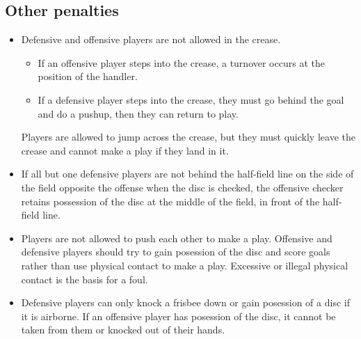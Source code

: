 \documentclass[10pt]{article}
\begin{document}
\subsection{Other penalties}
\begin{itemize}
    \item Defensive and offensive players are not allowed in the crease.
        \begin{itemize}
            \item If an offensive player steps into the crease, a turnover occurs at the position of the handler.
            \item If a defensive player steps into the crease, they must go behind the goal and do a pushup, then they can return to play.
        \end{itemize}
        Players are allowed to jump across the crease, but they must quickly leave the crease and cannot make a play if they land in it.
    \item If all but one defensive players are not behind the half-field line on the side of the field opposite the offense when the disc is checked, the offensive checker retains possession of the disc at the middle of the field, in front of the half-field line.
    \item Players are not allowed to push each other to make a play. Offensive and defensive players should try to gain posession of the disc and score goals rather than use physical contact to make a play. Excessive or illegal physical contact is the basis for a foul.
    \item Defensive players can only knock a frisbee down or gain posession of a disc if it is airborne. If an offensive player has posession of the disc, it cannot be taken from them or knocked out of their hands.
\end{itemize}
\end{document}
